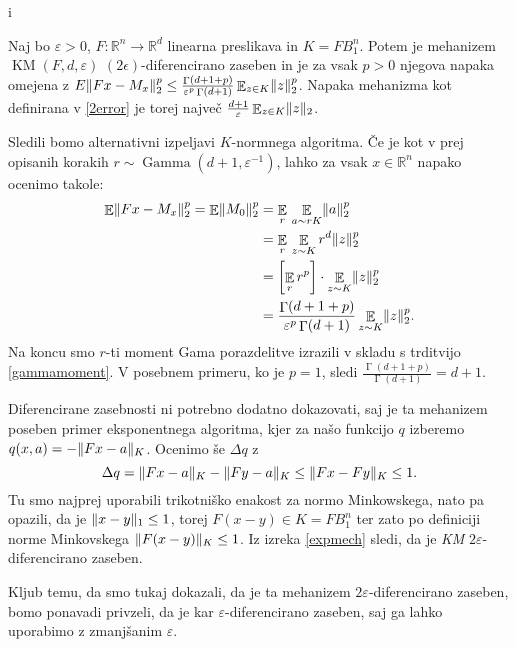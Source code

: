 i\documentclass[mat1]{fmfdelo}
\DeclarePairedDelimiter{\norm}{\lVert}{\rVert}
\newcommand{\R}{\mathbb R}
\DeclareMathOperator*{\E}{\mathbb E}
\DeclareMathOperator{\gfn}{\Gamma}
\DeclareMathOperator{\KM}{KM}
\newcommand{\query}{F: \R^n \to \R^d}
\begin{document}
\begin{izrek} \label{kerror}
    Naj bo $\varepsilon > 0$, $\query$ linearna preslikava in $K=FB_1^n$. Potem je mehanizem $\KM(F,d,\varepsilon)$ $(2\epsilon)$-diferencirano zaseben in je za vsak $p > 0$ njegova napaka omejena z $E \norm{Fx-M_x}_2^p \leq \frac{\gfn(d+1+p)}{\varepsilon^p \gfn(d+1)} \E_{z \in K} \norm{z}^p_2$. Napaka mehanizma kot definirana v \ref{2error} je torej največ $\frac{d+1}{\varepsilon} \E_{z \in K} \norm{z}_2$.
\end{izrek}

\begin{dokaz}
    Sledili bomo alternativni izpeljavi $K$-normnega algoritma. Če je kot v prej opisanih korakih $r \sim \operatorname{Gamma}(d+1, \varepsilon^{-1})$, lahko za vsak $x \in \R^n$ napako ocenimo takole:
    \begin{equation*}
        \begin{aligned}
        \E \norm{Fx-M_x}_2^p = \E \norm{M_0}_2^p &= \E_{r} \, \E_{a\sim rK} \norm{a}_2^p \\
        &= \E_{r} \, \E_{z\sim K} r^d \norm{z}_2^p \\
        &= \left[ \E_{r} r^p \right] \cdot \E_{z\sim K} \norm{z}_2^p \\
        &= \frac{\gfn(d+1+p)}{\varepsilon^p \gfn(d+1)} \E_{z\sim K} \norm{z}_2^p.
        \end{aligned}
    \end{equation*}
    Na koncu smo $r$-ti moment Gama porazdelitve izrazili v skladu s trditvijo \ref{gammamoment}. V posebnem primeru, ko je $p=1$, sledi $\frac{\gfn(d+1+p)}{\gfn(d+1)} = d+1$.
    
    Diferencirane zasebnosti ni potrebno dodatno dokazovati, saj je ta mehanizem poseben primer eksponentnega algoritma, kjer za našo funkcijo $q$ izberemo $q(x, a) = -\norm{Fx-a}_K$. Ocenimo še $\Delta q$ z
    \begin{equation*}
        \Delta q = \norm{Fx-a}_K - \norm{Fy-a}_K \leq \norm{Fx-Fy}_K \leq 1.
    \end{equation*}
    Tu smo najprej uporabili trikotniško enakost za normo Minkowskega, nato pa opazili, da je $\norm{x-y}_1 \leq 1$, torej $F(x-y) \in K=FB_1^n$ ter zato po definiciji norme Minkovskega $\norm{F(x-y)}_K \leq 1$. Iz izreka \ref{expmech} sledi, da je {\em KM} $2\varepsilon$-diferencirano zaseben.
\end{dokaz}

\begin{opomba}
    Kljub temu, da smo tukaj dokazali, da je ta mehanizem $2\varepsilon$-diferen\-cirano zaseben, bomo ponavadi privzeli, da je kar $\varepsilon$-diferencirano zaseben, saj ga lahko uporabimo z zmanjšanim $\varepsilon$.
\end{opomba}
\end{document}
